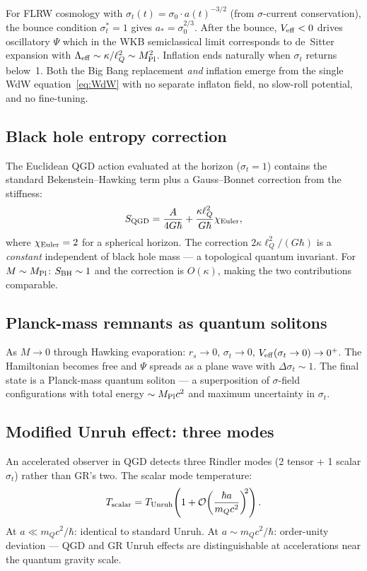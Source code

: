 \documentclass[11pt,a4paper]{article}
\theoremstyle{plain}
\theoremstyle{definition}
\theoremstyle{remark}
\newcommand{\lQ}{\ell_Q}
\newcommand{\mQ}{m_Q}
\newcommand{\sigt}{\sigma_t}
\begin{document}
For FLRW cosmology with $\sigt(t) = \sigma_0\cdot a(t)^{-3/2}$ (from
$\sigma$-current conservation), the bounce condition $\sigt^*=1$ gives
$a_* = \sigma_0^{2/3}$.  After the bounce, $V_{\rm eff}<0$ drives oscillatory
$\Psi$ which in the WKB semiclassical limit corresponds to de~Sitter expansion
with $\Lambda_{\rm eff}\sim\kappa/\lQ^2\sim M_{\rm Pl}^2$.  Inflation ends
naturally when $\sigt$ returns below~1.  Both the Big Bang replacement
\emph{and} inflation emerge from the single WdW equation~\eqref{eq:WdW}
with no separate inflaton field, no slow-roll potential, and no fine-tuning.

\subsection{Black hole entropy correction}

The Euclidean QGD action evaluated at the horizon ($\sigt=1$) contains the
standard Bekenstein--Hawking term plus a Gauss--Bonnet correction from the
stiffness:
\begin{equation}
  S_{\rm QGD} = \frac{A}{4G\hbar} + \frac{\kappa\lQ^2}{G\hbar}\chi_{\rm Euler},
  \label{eq:entropy_QGD}
\end{equation}
where $\chi_{\rm Euler}=2$ for a spherical horizon.  The correction
$2\kappa\lQ^2/(G\hbar)$ is a \emph{constant} independent of black hole mass ---
a topological quantum invariant.  For $M\sim M_{\rm Pl}$: $S_{\rm BH}\sim1$
and the correction is $O(\kappa)$, making the two contributions comparable.

\subsection{Planck-mass remnants as quantum solitons}

As $M\to0$ through Hawking evaporation: $r_s\to0$, $\sigt\to0$,
$V_{\rm eff}(\sigt\to0)\to0^+$.  The Hamiltonian becomes free and $\Psi$
spreads as a plane wave with $\Delta\sigt\sim1$.  The final state is a
Planck-mass quantum soliton --- a superposition of $\sigma$-field configurations
with total energy $\sim M_{\rm Pl}c^2$ and maximum uncertainty in $\sigt$.

\subsection{Modified Unruh effect: three modes}

An accelerated observer in QGD detects three Rindler modes (2 tensor + 1
scalar $\sigt$) rather than GR's two.  The scalar mode temperature:
\begin{equation}
  T_{\rm scalar} = T_{\rm Unruh}\!\left(1 + \mathcal{O}\!\left(
    \frac{\hbar a}{\mQ c^2}\right)^{\!\!2}\right).
  \label{eq:Unruh_QGD}
\end{equation}
At $a\ll\mQ c^2/\hbar$: identical to standard Unruh.
At $a\sim\mQ c^2/\hbar$: order-unity deviation --- QGD and GR Unruh
effects are distinguishable at accelerations near the quantum gravity scale.
\end{document}
